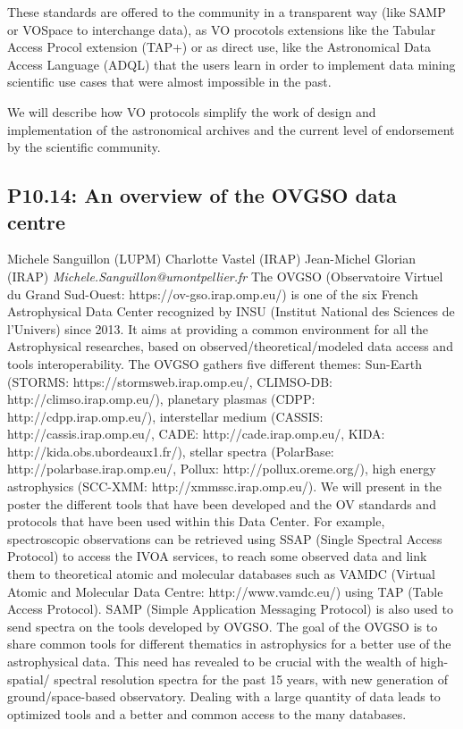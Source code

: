 \documentclass{report}
\begin{document}
These standards are offered to the community in a transparent way (like SAMP or VOSpace to interchange data), as VO procotols extensions like the Tabular Access Procol extension (TAP+) or as direct use, like the Astronomical Data Access Language (ADQL) that the users learn in order to implement data mining scientific use cases that were almost impossible in the past.

We will describe how VO protocols simplify the work of design and implementation of the astronomical archives and the current level of endorsement by the scientific community.\newline
\newpage
\subsection*{P10.14: An overview of the OVGSO data centre}
\bigskip
Michele Sanguillon (LUPM) \newline Charlotte Vastel (IRAP) \newline  Jean-Michel Glorian (IRAP)\newline   \newline  \newline  \newline\newline
{\it Michele.Sanguillon@umontpellier.fr}\newline
\newline\newline
The OVGSO (Observatoire Virtuel du Grand Sud-Ouest: https://ov-gso.irap.omp.eu/) is one of the six French Astrophysical Data Center recognized by INSU (Institut National des Sciences de l’Univers) since 2013. It aims at providing a common environment for all the Astrophysical researches, based on observed/theoretical/modeled data access and tools interoperability. The OVGSO gathers five
different themes: Sun-Earth (STORMS: https://stormsweb.irap.omp.eu/, CLIMSO-DB: http://climso.irap.omp.eu/), planetary plasmas (CDPP: http://cdpp.irap.omp.eu/), interstellar medium (CASSIS: http://cassis.irap.omp.eu/, CADE: http://cade.irap.omp.eu/, KIDA: http://kida.obs.ubordeaux1.fr/), stellar spectra (PolarBase: http://polarbase.irap.omp.eu/, Pollux: http://pollux.oreme.org/), high energy astrophysics (SCC-XMM: http://xmmssc.irap.omp.eu/). We will present in the poster the different tools that have been developed and the OV standards and protocols that have been used within this Data Center. For example, spectroscopic observations can be retrieved using SSAP (Single Spectral Access Protocol) to access the IVOA services, to reach some observed data and link them to theoretical atomic and molecular databases such as VAMDC (Virtual Atomic and Molecular Data Centre: http://www.vamdc.eu/) using TAP (Table Access Protocol).
SAMP (Simple Application Messaging Protocol) is also used to send spectra on the tools developed by OVGSO.
The goal of the OVGSO is to share common tools for different thematics in astrophysics for a better use of the astrophysical data. This need has revealed to be crucial with the wealth of high-spatial/
spectral resolution spectra for the past 15 years, with new generation of ground/space-based observatory. Dealing with a large quantity of data leads to optimized tools and a better and common access to the many databases.\newline
\newpage
\end{document}
